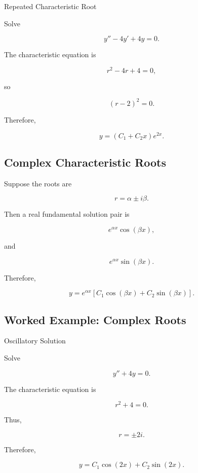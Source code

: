 \begin{workedexamplebox}{Repeated Characteristic Root}

Solve

\[
y''-4y'+4y=0.
\]

The characteristic equation is

\[
r^2-4r+4=0,
\]

so

\[
(r-2)^2=0.
\]

Therefore,

\begin{answerbox}
\[
\boxed{
y
=
(
C_1+C_2x
)
e^{2x}.
}
\]
\end{answerbox}

\end{workedexamplebox}

\subsection{Complex Characteristic Roots}
\label{subsec:complex-characteristic-roots}

Suppose the roots are

\[
\boxed{
r
=
\alpha
\pm
i\beta.
}
\]

Then a real fundamental solution pair is

\[
e^{\alpha x}\cos(\beta x),
\]

and

\[
e^{\alpha x}\sin(\beta x).
\]

Therefore,

\[
\boxed{
y
=
e^{\alpha x}
\left[
C_1\cos(\beta x)
+
C_2\sin(\beta x)
\right].
}
\]

\subsection{Worked Example: Complex Roots}
\label{subsec:worked-complex-roots}

\begin{workedexamplebox}{Oscillatory Solution}

Solve

\[
y''+4y=0.
\]

The characteristic equation is

\[
r^2+4=0.
\]

Thus,

\[
r=\pm2i.
\]

Therefore,

\begin{answerbox}
\[
\boxed{
y
=
C_1\cos(2x)
+
C_2\sin(2x).
}
\]
\end{answerbox}

\end{workedexamplebox}

